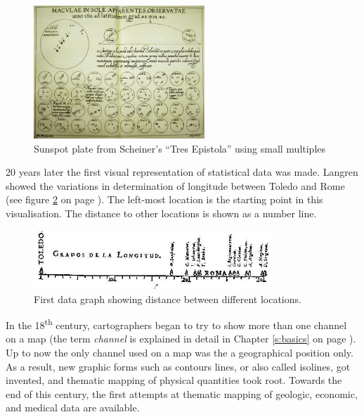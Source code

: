 \begin{figure}[!htb]
\centering
\includegraphics[height=5cm,keepaspectratio]{images/history/small-multiples.png}
\caption[
    Sunspot plate from Scheiner's ``Tres Epistolae'' using small multiples, Urldate: 07.2016 \newline
\small\texttt{\url{http://cnx.rice.edu/content/m11970/latest/tres_epistolae.gif}}
]{Sunspot plate from Scheiner's ``Tres Epistola'' using small multiples}
\label{fig:small-multiples}
\end{figure}

20 years later the first visual representation of statistical data was made. Langren showed the variations in determination of longitude between Toledo and Rome (see figure \ref{fig:langren} on page \pageref{fig:langren}). The left-most location is the starting point in this visualisation. The distance to other locations is shown as a number line.

\begin{figure}[!htb]
\centering
\includegraphics[width=0.8\textwidth,keepaspectratio]{images/history/langren.jpg}
\caption[
    First data graph showing variations in determination of longitude between Toledo and Rome, Urldate: 07.2016 \newline
\small\texttt{\url{http://datavis.ca/milestones//admin/uploads/images/tufte/langren.jpg}}
]{First data graph showing distance between different locations.}
\label{fig:langren}
\end{figure}

In the 18\textsuperscript{th} century, cartographers began to try to show more than one channel on a map (the term \textit{channel} is explained in detail in Chapter \ref{s:basics} on page \pageref{s:basics}). Up to now the only channel used on a map was the a geographical position only. As a result, new graphic forms such as contours lines, or also called isolines, got invented, and thematic mapping of physical quantities took root. Towards the end of this century, the first attempts at thematic mapping of geologic, economic, and medical data are available.


